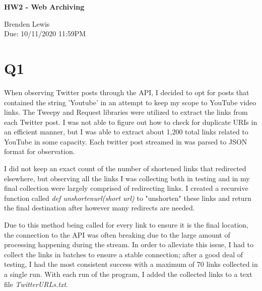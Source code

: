 \documentclass[12pt]{article}
\begin{document}
\begin{centering}
{\large\textbf{HW2 - Web Archiving}}

Brenden Lewis\\                     
Due: 10/11/2020 11:59PM\\                      
\end{centering}

\section*{Q1}
When observing Twitter posts through the API, I decided to opt for posts that contained the string 'Youtube' in an attempt to keep my scope to YouTube video links. The Tweepy and Request libraries were utilized to extract the links from each Twitter post. I was not able to figure out how to check for duplicate URIs in an efficient manner, but I was able to extract about 1,200 total links related to YouTube in some capacity. Each twitter post streamed in was parsed to JSON format for observation.

\par I did not keep an exact count of the number of shortened links that redirected elsewhere, but observing all the links I was collecting both in testing and in my final collection were largely comprised of redirecting links. I created a recursive function called \emph{def unshorten\textunderscore url(short \textunderscore url)} to "unshorten" these links and return the final destination after however many redirects are needed.

\par Due to this method being called for every link to ensure it is the final location, the connection to the API was often breaking due to the large amount of processing happening during the stream. In order to alleviate this issue, I had to collect the links in batches to ensure a stable connection; after a good deal of testing, I had the most consistent success with a maximum of 70 links collected in a single run. With each run of the program, I added the collected links to a text file \emph{TwitterURLs.txt}.


\end{document}
